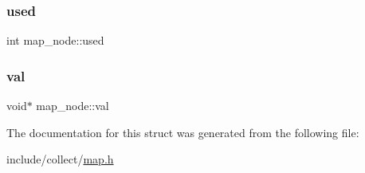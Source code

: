 \subsubsection{\texorpdfstring{used}{used}}
{\footnotesize\ttfamily int map\+\_\+node\+::used}

\mbox{\label{structmap__node_a1d4251143de664ac95bbeb48d0323f1b}} 
\subsubsection{\texorpdfstring{val}{val}}
{\footnotesize\ttfamily void$\ast$ map\+\_\+node\+::val}



The documentation for this struct was generated from the following file\+:\begin{DoxyCompactItemize}
\item 
include/collect/\hyperlink{map_8h}{map.\+h}\end{DoxyCompactItemize}
